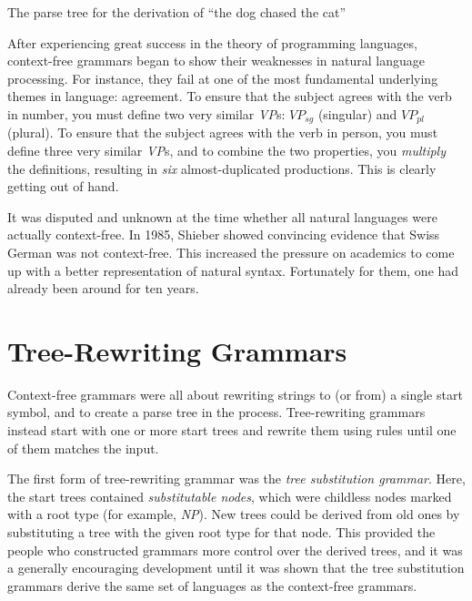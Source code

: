 \documentclass[12pt]{article}
\newcommand{\defn}[1]{\textit{#1}}
\begin{document}
\begin{Figure}
\begin{center}
\end{center}
\caption{The parse tree for the derivation of ``the dog chased the
cat''}
\label{dog-cat-tree}
\end{Figure}

After experiencing great success in the theory of programming languages,
context-free grammars began to show their weaknesses in natural language
processing.  For instance, they fail at one of the most fundamental
underlying themes in language: agreement.  To ensure that the subject
agrees with the verb in number, you must define two very similar
\textit{VP}s: $\mathit{VP}_\mathit{sg}$ (singular) and
$\mathit{VP}_\mathit{pl}$ (plural).  To ensure that the subject agrees
with the verb in person, you must define three very similar
\textit{VP}s, and to combine the two properties, you \textit{multiply}
the definitions, resulting in \textit{six} almost-duplicated
productions.  This is clearly getting out of hand.

It was disputed and unknown at the time whether all natural languages
were actually context-free.  In 1985, Shieber\cite{Shieber-1985} showed
convincing evidence that Swiss German was not context-free.  This
increased the pressure on academics to come up with a better
representation of natural syntax.  Fortunately for them, one had already
been around for ten years.

\section{Tree-Rewriting Grammars}
\label{sec-tree-rewriting-grammars}

Context-free grammars were all about rewriting strings to (or from) a
single start symbol, and to create a parse tree in the process.
Tree-rewriting grammars instead start with one or more start trees and
rewrite them using rules until one of them matches the input. 

The first form of tree-rewriting grammar was the \defn{tree substitution
grammar}.  Here, the start trees contained \defn{substitutable nodes},
which were childless nodes marked with a root type (for example,
\textit{NP}).  New trees could be derived from old ones by substituting
a tree with the given root type for that node.  This provided the people
who constructed grammars more control over the derived trees, and it was
a generally encouraging development until it was shown that the tree
substitution grammars derive the same set of languages as the
context-free grammars.
\end{document}
